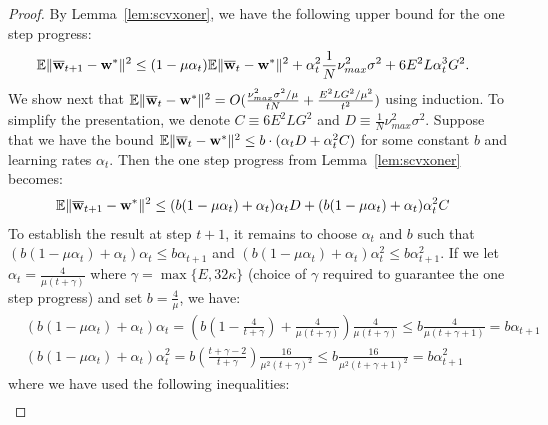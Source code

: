 \begin{proof}
	By Lemma~\ref{lem:scvxoner}, we have the following upper bound for the one step progress: 
	\begin{align*}
	\mathbb{E}\|{\overline{\mathbf{w}}}_{t+1}-{\mathbf{w}}^{\ast}\|^{2} & \leq(1-\mu\alpha_{t})\mathbb{E}\|{\overline{\mathbf{w}}}_{t}-{\mathbf{w}}^{\ast}\|^{2}+\alpha_{t}^{2}\frac{1}{N}\nu_{max}^{2}\sigma^{2}+6E^{2}L\alpha_{t}^{3}G^{2}.
	\end{align*}
	We show next that $\mathbb{E}\|{\overline{\mathbf{w}}}_{t}-{\mathbf{w}}^{\ast}\|^{2}=O(\frac{\nu_{max}^{2}\sigma^{2}/\mu}{tN}+\frac{E^{2}LG^{2}/\mu^2}{t^{2}})$ using induction. 
	To simplify the presentation, we denote $C\equiv6E^{2}LG^{2}$ and $D\equiv\frac{1}{N}\nu_{max}^{2}\sigma^{2}$.
	Suppose that we have the bound $\mathbb{E}\|{\overline{\mathbf{w}}}_{t}-{\mathbf{w}}^{\ast}\|^{2}\leq b\cdot(\alpha_{t}D+\alpha_{t}^{2}C)$
	for some constant $b$ and learning rates $\alpha_{t}$. Then the one step progress from Lemma~\ref{lem:scvxoner} becomes:
	\begin{align*}
	\mathbb{E}\|{\overline{\mathbf{w}}}_{t+1}-{\mathbf{w}}^{\ast}\|^{2} & \leq (b(1-\mu\alpha_{t})+\alpha_{t})\alpha_{t}D+(b(1-\mu\alpha_{t})+\alpha_{t})\alpha_{t}^{2}C
	\end{align*}
	To establish the result at step $t+1$, it remains to choose $\alpha_{t}$ and $b$ such that $(b(1-\mu\alpha_{t})+\alpha_{t})\alpha_{t}\leq b\alpha_{t+1}$
	and $(b(1-\mu\alpha_{t})+\alpha_{t})\alpha_{t}^{2}\leq b\alpha_{t+1}^{2}$.
	If we let $\alpha_{t}=\frac{4}{\mu(t+\gamma)}$
	where $\gamma=\max\{E,32\kappa\}$ (choice of $\gamma$ required to guarantee the one step progress) and set $b=\frac{4}{\mu}$, we have:
	\begin{align*}
	& (b(1-\mu\alpha_{t})+\alpha_{t})\alpha_{t}  =\left(b(1-\frac{4}{t+\gamma})+\frac{4}{\mu(t+\gamma)}\right)\frac{4}{\mu(t+\gamma)}
	 \leq b\frac{4}{\mu(t+\gamma+1)}=b\alpha_{t+1}\\
	& (b(1-\mu\alpha_{t})+\alpha_{t})\alpha_{t}^{2} 
	 =b(\frac{t+\gamma-2}{t+\gamma})\frac{16}{\mu^{2}(t+\gamma)^{2}} \leq b\frac{16}{\mu^{2}(t+\gamma+1)^{2}}=b\alpha_{t+1}^{2}
	\end{align*}
	where we have used the following inequalities:
	\begin{align*}

\end{align*}
\end{proof}
